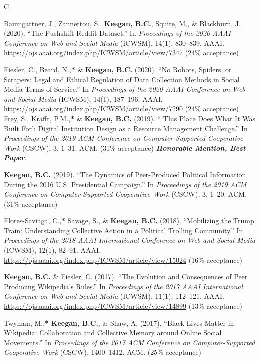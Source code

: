 \documentclass{cv}
\begin{document}
\begin{entries}{C}
		\item Baumgartner, J., Zannettou, S., \textbf{Keegan, B.C.}, Squire, M., \& Blackburn, J. (2020). ``The Pushshift Reddit Dataset.'' In \textit{Proceedings of the 2020 AAAI Conference on Web and Social Media} (ICWSM), 14(1), 830--839. AAAI. \url{https://ojs.aaai.org/index.php/ICWSM/article/view/7347} (24\% acceptance)
		\item Fiesler, C., Beard, N.,\textbf{*} \& \textbf{Keegan, B.C.} (2020). ``No Robots, Spiders, or Scrapers: Legal and Ethical Regulation of Data Collection Methods in Social Media Terms of Service.'' In \textit{Proceedings of the 2020 AAAI Conference on Web and Social Media} (ICWSM), 14(1), 187--196. AAAI. \url{https://ojs.aaai.org/index.php/ICWSM/article/view/7290} (24\% acceptance)
		\awarditem Frey, S., Krafft, P.M.,\textbf{*} \& \textbf{Keegan, B.C.} (2019). ```This Place Does What It Was Built For': Digital Institution Design as a Resource Management Challenge.'' In \textit{Proceedings of the 2019 ACM Conference on Computer-Supported Cooperative Work} (CSCW), 3, 1--31. ACM.  (31\% acceptance) \textbf{\textit{Honorable Mention, Best Paper}}.
		\item \textbf{Keegan, B.C.} (2019). ``The Dynamics of Peer-Produced Political Information During the 2016 U.S. Presidential Campaign.'' In \textit{Proceedings of the 2019 ACM Conference on Computer-Supported Cooperative Work} (CSCW), 3, 1--20. ACM.  (31\% acceptance)
		\item Flores-Saviaga, C.,\textbf{*} Savage, S., \& \textbf{Keegan, B.C.} (2018). ``Mobilizing the Trump Train: Understanding Collective Action in a Political Trolling Community.'' In \textit{Proceedings of the 2018 AAAI International Conference on Web and Social Media} (ICWSM), 12(1), 82--91. AAAI. \url{https://ojs.aaai.org/index.php/ICWSM/article/view/15024} (16\% acceptance)
		\item \textbf{Keegan, B.C.} \& Fiesler, C. (2017). ``The Evolution and Consequences of Peer Producing Wikipedia's Rules.'' In \textit{Proceedings of the 2017 AAAI International Conference on Web and Social Media} (ICWSM), 11(1), 112--121. AAAI. \url{https://ojs.aaai.org/index.php/ICWSM/article/view/14899} (13\% acceptance)
		\item Twyman, M.,\textbf{*} \textbf{Keegan, B.C.}, \& Shaw, A. (2017). ``Black Lives Matter in Wikipedia: Collaboration and Collective Memory around Online Social Movements.'' In \textit{Proceedings of the 2017 ACM Conference on Computer-Supported Cooperative Work} (CSCW), 1400--1412. ACM.  (25\% acceptance)

\end{entries}
\end{document}
